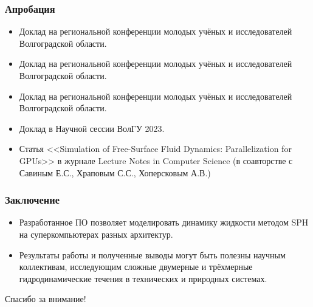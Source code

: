 \begin{frame}
    \frametitle{Апробация}
    \begin{itemize}
        \item Доклад на  региональной конференции молодых учёных и исследователей Волгоградской области.
        \item Доклад на  региональной конференции молодых учёных и исследователей Волгоградской области.
        \item Доклад на  региональной конференции молодых учёных и исследователей Волгоградской области.
        \item Доклад в Научной сессии ВолГУ 2023.
        \item Статья <<Simulation of Free-Surface Fluid Dynamics: Parallelization for GPUs>> 
            в журнале Lecture Notes in Computer Science 
            (в соавторстве с Савиным Е.С., Храповым С.С., Хоперсковым А.В.)
    \end{itemize}
\end{frame}

\begin{frame}
    \frametitle{Заключение}
    \begin{itemize}
        \item Разработанное ПО позволяет моделировать динамику жидкости методом SPH 
            на суперкомпьютерах разных архитектур.
        \item Результаты работы и полученные выводы могут быть полезны научным коллективам,
            исследующим сложные двумерные и трёхмерные гидродинамические течения в технических и природных системах.
    \end{itemize}
\end{frame}

\begin{frame} %
    \begin{center}
        \Huge
        Спасибо за внимание!
    \end{center}
\end{frame}
